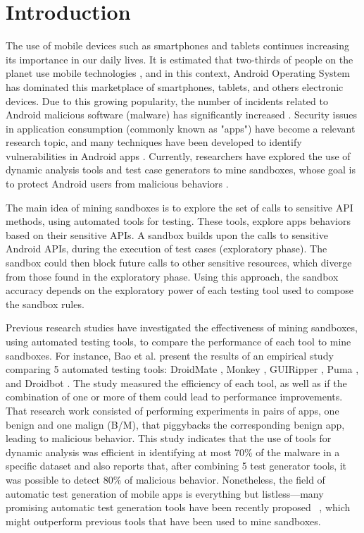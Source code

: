 \section{Introduction}

The use of mobile devices such as smartphones and tablets continues increasing its importance in our daily lives. It is estimated that two-thirds of people on the planet use mobile technologies \cite{Comscore}, and in this context, Android Operating System has dominated this marketplace of smartphones, tablets, and others electronic devices. Due to this growing popularity, the number of incidents related to Android malicious software (malware) has significantly increased \cite{faruki2014android,tan2015securing}. Security issues in application consumption (commonly known as "apps") have become a relevant research topic, and many techniques have been developed to identify vulnerabilities in Android apps \cite{tan2015securing}. Currently, researchers have explored the use of dynamic analysis tools and test case generators to mine sandboxes, whose goal is to protect Android users from malicious behaviors \cite{jamrozik2016mining}.

The main idea of mining sandboxes is to explore the set of calls to sensitive API methods, using automated tools for testing. These tools, explore apps behaviors based on their sensitive APIs. A sandbox builds upon the calls to sensitive Android APIs, during the execution of test cases (exploratory phase). The sandbox could then block future calls to other sensitive resources, which diverge from those found in the exploratory phase. Using this approach, the sandbox accuracy depends on the exploratory power of each testing tool used to compose the sandbox rules.

Previous research studies have investigated the effectiveness of mining sandboxes, using automated testing tools, to compare the performance of each tool to mine sandboxes. For instance, Bao et al. \cite{bao2018mining} present the results of an empirical study comparing 5 automated testing tools: DroidMate \cite{jamrozik2016droidmate}, Monkey \cite{Monkey}, GUIRipper \cite{amalfitano2012using}, Puma \cite{hao2014puma}, and Droidbot \cite{li2017droidbot}. The study measured the efficiency of each tool, as well as if the combination of one or more of them could lead to performance improvements. That research work consisted of performing experiments in pairs of apps, one benign and one malign (B/M), that piggybacks the corresponding benign app, leading to malicious behavior. This study indicates that the use of tools for dynamic analysis was efficient in identifying at most 70\% of the malware in a specific dataset and also reports that, after combining 5 test generator tools, it was possible to detect 80\% of malicious behavior. Nonetheless, the field of automatic test generation of mobile apps is everything but listless---many promising automatic test generation tools have been recently proposed
~\cite{cai2020longitudinal,li2019deep}, which might outperform previous tools that have been used to mine sandboxes.

